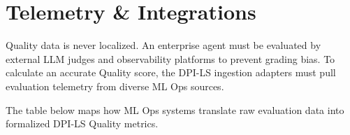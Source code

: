 \documentclass[11pt,a4paper]{article}
\begin{document}
\vspace{1cm}

\newpage

\section{Telemetry \& Integrations}

Quality data is never localized. An enterprise agent must be evaluated by external LLM judges and observability platforms to prevent grading bias. To calculate an accurate Quality score, the DPI-LS ingestion adapters must pull evaluation telemetry from diverse ML Ops sources.

The table below maps how ML Ops systems translate raw evaluation data into formalized DPI-LS Quality metrics.
\end{document}

